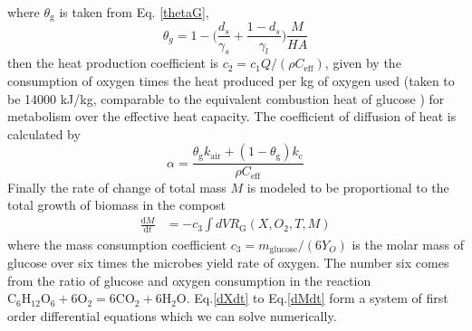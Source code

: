 \documentclass[12pt, letterpaper, titlepage]{article}
\begin{document}
where $\theta_{\mathrm{g}}$ is taken from Eq. \ref{thetaG},
$$\theta_g = 1-\Big(\frac{d_s}{\gamma_s}+\frac{1-d_s}{\gamma_l}\Big)\frac{M}{HA}$$
then the heat production coefficient is $c_2 = c_1Q/(\rho C_{\mathrm{eff}})$, given by the consumption of oxygen times the heat produced per kg of oxygen used (taken to be 14000 kJ/kg, comparable to the equivalent combustion heat of glucose \cite{heat}) for metabolism over the effective heat capacity. The coefficient of diffusion of heat is calculated by \cite{burning}
$$\alpha = \frac{\theta_{\mathrm{g}}k_{\mathrm{air}} + (1-\theta_{\mathrm{g}})k_{\mathrm{c}}}{\rho C_{\mathrm{eff}}}$$
Finally the rate of change of total mass $M$ is modeled to be proportional to the total growth of biomass in the compost
    \begin{align}
        \frac{\mathrm{d} M}{\mathrm{d} t} &= -c_3\int dV R_{\mathrm{G}}(X, O_2, T, M) \label{dMdt}
    \end{align}
where the mass consumption coefficient $c_3 = m_{\mathrm{glucose}}/(6Y_O)$ is the molar mass of glucose over six times the microbes yield rate of oxygen. The number six comes from the ratio of glucose and oxygen consumption in the reaction $\mathrm{C_6H_{12}O_6 + 6O_2 = 6CO_2 + 6H_2O}$.
Eq.\ref{dXdt} to Eq.\ref{dMdt} form a system of first order differential equations which we can solve numerically.
 
\end{document}
